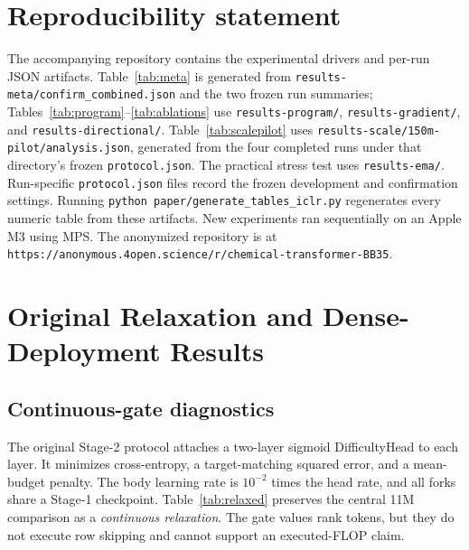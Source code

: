 \documentclass{article}
\newcommand{\repoURL}{\texttt{https://anonymous.4open.science/r/chemical-transformer-BB35}}
\begin{document}
\section*{Reproducibility statement}
The accompanying repository contains the experimental drivers and per-run
JSON artifacts. Table~\ref{tab:meta} is generated from
\texttt{results-meta/confirm\_combined.json} and the two frozen run summaries;
Tables~\ref{tab:program}--\ref{tab:ablations} use
\texttt{results-program/}, \texttt{results-gradient/}, and
\texttt{results-directional/}. Table~\ref{tab:scalepilot} uses
\texttt{results-scale/150m-pilot/analysis.json}, generated from the four
completed runs under that directory's frozen \texttt{protocol.json}. The practical stress test uses
\texttt{results-ema/}. Run-specific \texttt{protocol.json} files record the
frozen development and confirmation settings. Running
\texttt{python paper/generate\_tables\_iclr.py} regenerates every numeric table
from these artifacts. New experiments ran sequentially on an Apple M3 using
MPS. The anonymized repository is at \repoURL.




\appendix

\section{Original Relaxation and Dense-Deployment Results}
\label{app:legacy}

\subsection{Continuous-gate diagnostics}
The original Stage-2 protocol attaches a two-layer sigmoid DifficultyHead to
each layer. It minimizes cross-entropy, a target-matching squared error, and a
mean-budget penalty. The body learning rate is $10^{-2}$ times the head rate,
and all forks share a Stage-1 checkpoint. Table~\ref{tab:relaxed} preserves
the central 11M comparison as a \emph{continuous relaxation}. The gate values
rank tokens, but they do not execute row skipping and cannot support an
executed-FLOP claim.

\begin{table}[h]
\centering
\caption{Original 11M continuous-gate supervision results (three seeds,
mean $\pm$ standard deviation). These results diagnose target content and gate
ordering only; they are not executable-compute comparisons.}
\label{tab:relaxed}
\relaxeddiagnostictable
\end{table}
\end{document}

